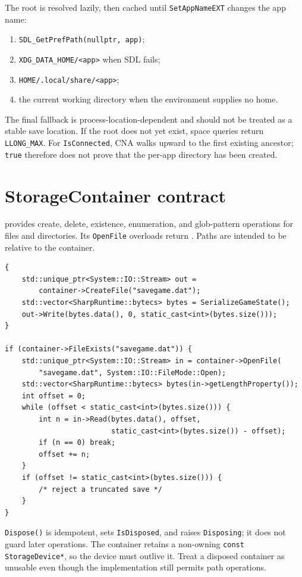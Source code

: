 The root is resolved lazily, then cached until \texttt{SetAppNameEXT} changes the app name:

\begin{enumerate}
  \item \texttt{SDL\_GetPrefPath(nullptr, app)};
  \item \texttt{XDG\_DATA\_HOME/<app>} when SDL fails;
  \item \texttt{HOME/.local/share/<app>};
  \item the current working directory when the environment supplies no home.
\end{enumerate}

The final fallback is process-location-dependent and should not be treated as a stable save
location. If the root does not yet exist, space queries return \texttt{LLONG\_MAX}. For
\texttt{IsConnected}, CNA walks upward to the first existing ancestor; \texttt{true} therefore
does not prove that the per-app directory has been created.

\section{StorageContainer contract}

 provides create, delete, existence, enumeration, and glob-pattern
operations for files and directories. Its \texttt{OpenFile} overloads return
. Paths are intended to be relative to the container.

\begin{lstlisting}
{
    std::unique_ptr<System::IO::Stream> out =
        container->CreateFile("savegame.dat");
    std::vector<SharpRuntime::bytecs> bytes = SerializeGameState();
    out->Write(bytes.data(), 0, static_cast<int>(bytes.size()));
}

if (container->FileExists("savegame.dat")) {
    std::unique_ptr<System::IO::Stream> in = container->OpenFile(
        "savegame.dat", System::IO::FileMode::Open);
    std::vector<SharpRuntime::bytecs> bytes(in->getLengthProperty());
    int offset = 0;
    while (offset < static_cast<int>(bytes.size())) {
        int n = in->Read(bytes.data(), offset,
                         static_cast<int>(bytes.size()) - offset);
        if (n == 0) break;
        offset += n;
    }
    if (offset != static_cast<int>(bytes.size())) {
        /* reject a truncated save */
    }
}
\end{lstlisting}

\texttt{Dispose()} is idempotent, sets \texttt{IsDisposed}, and raises \texttt{Disposing}; it
does not guard later operations. The container retains a non-owning
\texttt{const StorageDevice*}, so the device must outlive it. Treat a disposed container as
unusable even though the implementation still permits path operations.

